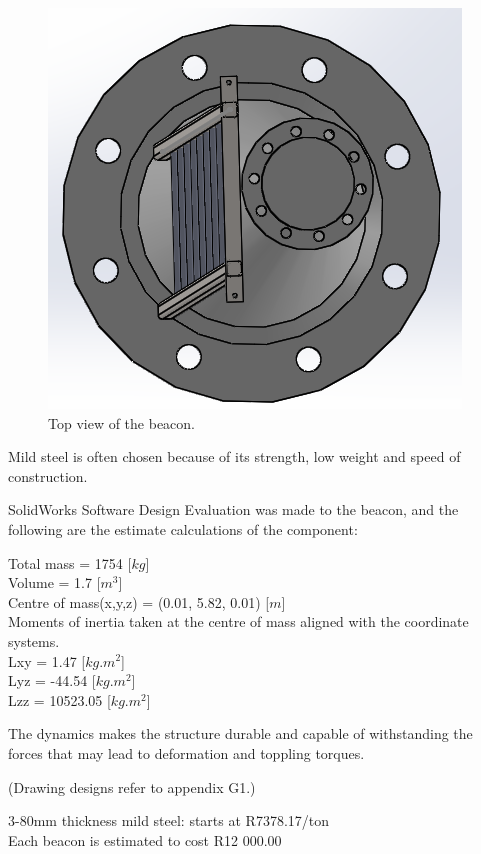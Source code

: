 \begin{figure}[H]
\begin{center}
\includegraphics[scale=0.8]{data/mechanical/7.png}
\caption{Top view of the beacon.}
\label{fig:mech-7}
\end{center}
\end{figure}

Mild steel is often chosen because of its strength, low weight and speed of construction.\cite{mech-4}

SolidWorks Software Design Evaluation was made to the beacon, and the following are the estimate calculations of the component:
\begin{center}
Total mass = 1754 [$kg$]\\
Volume = 1.7 [$m^3$]\\
Centre of mass(x,y,z) = (0.01, 5.82, 0.01) [$m$]\\
Moments of inertia taken at the centre of mass aligned with the coordinate systems.\\
Lxy = 1.47 [$kg.m^2$]\\
Lyz = -44.54 [$kg.m^2$]\\
Lzz = 10523.05 [$kg.m^2$]
\end{center}

The dynamics makes the structure durable and capable of withstanding the forces that may lead to deformation and toppling torques.

(Drawing designs refer to appendix G1.)

3-80mm thickness mild steel: starts at R7378.17/ton\\
Each beacon is estimated to cost R12 000.00



